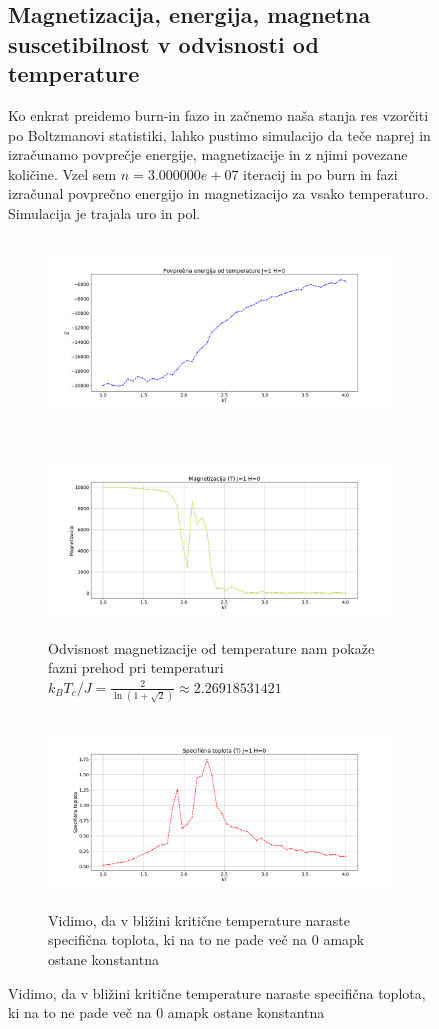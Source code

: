 \documentclass[11pt, a4paper]{article}
\begin{document}
\begin{figure}[H]
\begin{figure}[H]
\end{figure}  
\subsection{Magnetizacija, energija, magnetna suscetibilnost v odvisnosti od temperature}
Ko enkrat preidemo burn-in fazo in začnemo naša stanja res vzorčiti po Boltzmanovi statistiki, lahko pustimo simulacijo da teče naprej in izračunamo povprečje energije, magnetizacije in z njimi povezane količine. Vzel sem $n = 3.000000e+07$ iteracij in po burn in fazi izračunal povprečno energijo in magnetizacijo za vsako temperaturo. Simulacija je trajala uro in pol.

 \begin{figure}[H]
\centering
  \includegraphics[width=17cm, height=5cm]{druga_energija.png}

\end{figure}  
 \begin{figure}[H]
\centering
  \includegraphics[width=17cm, height=5cm]{druga_magnetizacija.png}
\caption{Odvisnost magnetizacije od temperature nam pokaže fazni prehod pri temperaturi $k_B T_c/J = \frac{2}{\ln(1+\sqrt{2})} \approx 2.26918531421$}

\end{figure}  
 \begin{figure}[H]
\centering
  \includegraphics[width=17cm, height=5cm]{specificna_toplota.png}
\caption{Vidimo, da v bližini kritične temperature naraste specifična toplota, ki na to ne pade več na 0 amapk ostane konstantna}


\end{figure}
\end{figure}
\end{document}

